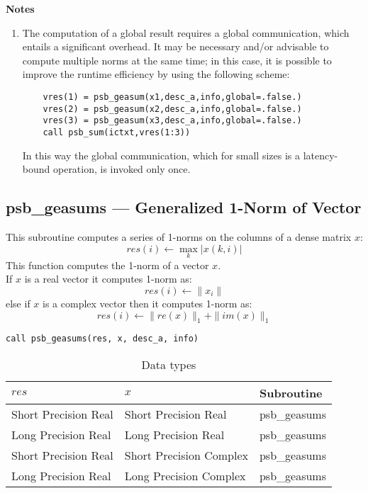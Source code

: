 {\par\noindent\large\bfseries Notes}
\begin{enumerate}
\item The computation of a global result requires a global
  communication, which entails a significant overhead. It may be
  necessary and/or advisable to compute multiple norms at the same 
  time; in this case, it is possible to improve the runtime efficiency
  by using the following scheme:
  \begin{lstlisting}
    vres(1) = psb_geasum(x1,desc_a,info,global=.false.)
    vres(2) = psb_geasum(x2,desc_a,info,global=.false.)
    vres(3) = psb_geasum(x3,desc_a,info,global=.false.)
    call psb_sum(ictxt,vres(1:3))
  \end{lstlisting}
  In this way the global communication, which for small sizes is a
  latency-bound operation, is invoked only once.
\end{enumerate}


\clearpage\subsection*{psb\_geasums --- Generalized 1-Norm of Vector}

This subroutine computes a series of  1-norms on the columns of
a  dense matrix  $x$: 
\[ res(i) \leftarrow \max_k |x(k,i)| \]
This function computes the 1-norm of a vector $x$.\\
If $x$ is a real vector 
it computes 1-norm as:
\[ res(i) \leftarrow  \|x_i\|\]
else if $x$ is a complex vector then it computes 1-norm  as:
\[ res(i) \leftarrow \|re(x)\|_1 + \|im(x)\|_1\]


\begin{verbatim}
call psb_geasums(res, x, desc_a, info)
\end{verbatim}

\begin{table}[h]
\begin{center}
\begin{tabular}{lll}
\hline
$res$ & $x$ & {\bf Subroutine}\\
\hline
Short Precision Real&Short Precision Real & psb\_geasums \\
Long Precision Real&Long Precision Real & psb\_geasums \\
Short Precision Real&Short Precision Complex & psb\_geasums \\
Long Precision Real&Long Precision Complex & psb\_geasums \\
\hline
\end{tabular}
\end{center}
\caption{Data types\label{tab:f90asums}}
\end{table}

